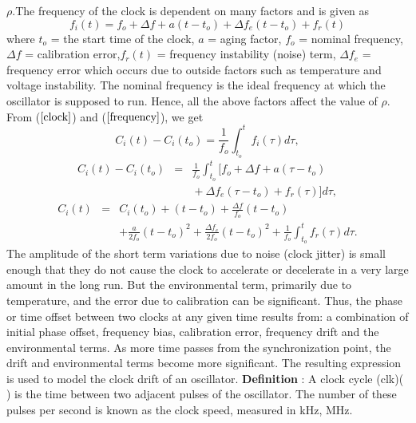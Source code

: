 \documentclass[a4paper,10pt]{report}
\begin{document}
$\rho$.\newline The frequency of the clock is dependent on many factors and is given as
\begin{equation}
f_i(t) = f_o + \Delta f + a(t-t_o) + \Delta f_e(t-t_o) + f_r(t)
\label{frequency}
\end{equation}
where \newline $t_o$ = the start time of the clock, \newline $a$ = aging factor,  \newline $f_o$ = nominal frequency, \newline $\Delta
f$ = calibration error,\newline $f_r(t)$ = frequency instability (noise) term, \newline $\Delta f_e$ = frequency error which occurs
due to outside factors such as temperature and voltage instability. 
\newline 
The nominal frequency is the ideal frequency at which the oscillator is supposed to run. \newline Hence, all the above factors affect the value of $\rho$.
From ($\ref{clock}$) and ($\ref{frequency}$), we get
\begin{equation}
C_i(t) - C_i(t_o) = \frac{1}{f_o} \int^{t}_{t_o}f_i(\tau)d\tau ,
\end{equation}
\begin{eqnarray*}
C_i(t) - C_i(t_o) & = & \frac{1}{f_o} \int^{t}_{t_o}{[f_o + \Delta f + a(\tau-t_o)  } \\
 &  & {} + \Delta f_e(\tau-t_o) + f_r(\tau)]d\tau ,
\label{fasika}
\end{eqnarray*}
\begin{eqnarray*}
C_i(t) & = & C_i(t_o) + (t-t_o) +\frac{\Delta f}{f_o}(t-t_o) \\
& & + \frac{a}{2f_o}(t-t_o)^2 + \frac{\Delta f_e}{2f_o}(t-t_o)^2 +
\frac{1}{f_o}\int^{t}_{t_o}{f_r(\tau)d\tau} .
\end{eqnarray*}
The amplitude of the short term variations due to noise (clock jitter) is small enough that they do not cause the clock to accelerate or decelerate in a very large amount in the long run. But the environmental term, primarily due to temperature, and the error due to calibration can be significant. Thus, the phase or time offset between two clocks at any given time results from: a combination of initial phase offset, frequency bias, calibration error, frequency drift and the environmental terms. As more time passes from the synchronization point, the drift and environmental terms become more significant. The resulting expression is used to model the clock drift of an oscillator.\newline
\textbf{Definition} : A clock cycle (clk)( ) is the time between two adjacent pulses of the oscillator. The number of these pulses per second is known as the clock speed, measured in kHz, MHz.
\end{document}
